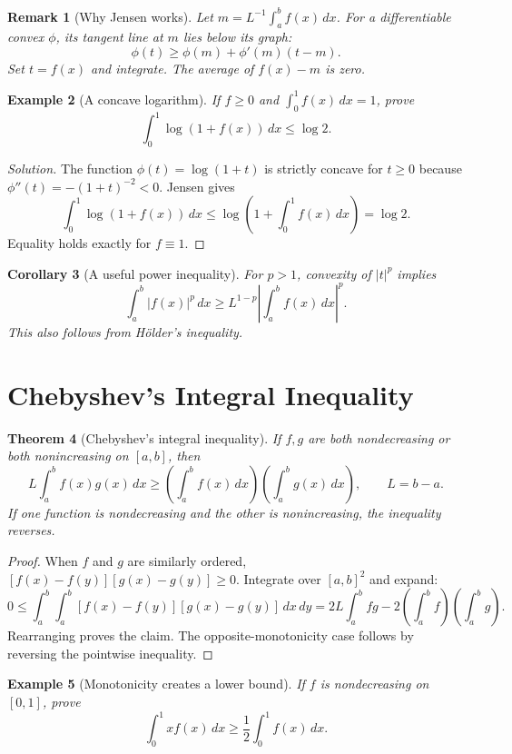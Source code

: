 \documentclass[11pt]{article}
\theoremstyle{plaincolon}
\newtheorem{theorem}{Theorem}[section]
\newtheorem{corollary}[theorem]{Corollary}
\theoremstyle{definitioncolon}
\newtheorem{example}[theorem]{Example}
\theoremstyle{remarkcolon}
\newtheorem{remark}[theorem]{Remark}
\newenvironment{solution}{\begin{proof}[Solution]}{\end{proof}}
\numberwithin{equation}{section}
\begin{document}
\begin{remark}[Why Jensen works]
Let $m=L^{-1}\int_a^b f(x)\,dx$. For a differentiable convex $\phi$, its tangent line at $m$ lies below its graph:
\[
\phi(t)\ge\phi(m)+\phi'(m)(t-m).
\]
Set $t=f(x)$ and integrate. The average of $f(x)-m$ is zero.
\end{remark}

\begin{example}[A concave logarithm]
If $f\ge0$ and $\int_0^1 f(x)\,dx=1$, prove
\[
\int_0^1\log(1+f(x))\,dx\le\log2.
\]
\end{example}

\begin{solution}
The function $\phi(t)=\log(1+t)$ is strictly concave for $t\ge0$ because
$\phi''(t)=-(1+t)^{-2}<0$. Jensen gives
\[
\int_0^1\log(1+f(x))\,dx
\le\log\left(1+\int_0^1 f(x)\,dx\right)=\log2.
\]
Equality holds exactly for $f\equiv1$.
\end{solution}

\begin{corollary}[A useful power inequality]
For $p>1$, convexity of $|t|^p$ implies
\[
\int_a^b |f(x)|^p\,dx\ge
L^{1-p}\left|\int_a^b f(x)\,dx\right|^p.
\]
This also follows from H\"older's inequality.
\end{corollary}

\section{Chebyshev's Integral Inequality}

\begin{theorem}[Chebyshev's integral inequality]
If $f,g$ are both nondecreasing or both nonincreasing on $[a,b]$, then
\[
L\int_a^b f(x)g(x)\,dx\ge
\left(\int_a^b f(x)\,dx\right)
\left(\int_a^b g(x)\,dx\right),\qquad L=b-a.
\]
If one function is nondecreasing and the other is nonincreasing, the inequality reverses.
\end{theorem}

\begin{proof}
When $f$ and $g$ are similarly ordered,
$[f(x)-f(y)][g(x)-g(y)]\ge0$. Integrate over $[a,b]^2$ and expand:
\[
0\le\int_a^b\!\int_a^b
[f(x)-f(y)][g(x)-g(y)]\,dx\,dy
=2L\int_a^b fg-2\left(\int_a^b f\right)\left(\int_a^b g\right).
\]
Rearranging proves the claim. The opposite-monotonicity case follows by reversing the pointwise inequality.
\end{proof}

\begin{example}[Monotonicity creates a lower bound]
If $f$ is nondecreasing on $[0,1]$, prove
\[
\int_0^1 xf(x)\,dx\ge\frac12\int_0^1 f(x)\,dx.
\]
\end{example}
\end{document}
